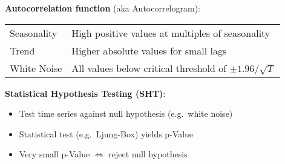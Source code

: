 \begin{minipage}[t]{0.5\textwidth}
\textbf{Autocorrelation function} (aka Autocorrelogram):\\
\begin{tabular}{ll}
    Seasonality & High positive values at multiples of seasonality \\
    Trend & Higher absolute values for small lags \\
    White Noise & All values below critical threshold of \(\pm 1.96 / \sqrt{T}\) \\
\end{tabular}
\end{minipage}
\hfill
\begin{minipage}[t]{0.46\textwidth}
\textbf{Statistical Hypothesis Testing (SHT)}:
\begin{itemize}
    \item Test time series against null hypothesis (e.g.\ white noise)
    \item Statistical test (e.g.\ Ljung-Box) yields p-Value
    \item Very small p-Value \(\Leftrightarrow\) reject null hypothesis
\end{itemize}
\end{minipage}

